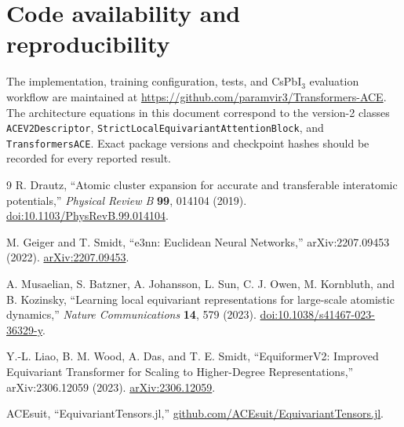 \documentclass[10pt]{article}
\begin{document}
\section*{Code availability and reproducibility}

The implementation, training configuration, tests, and CsPbI$_3$ evaluation
workflow are maintained at
\url{https://github.com/paramvir3/Transformers-ACE}. The architecture equations
in this document correspond to the version-2 classes
\texttt{ACEV2Descriptor}, \texttt{StrictLocalEquivariantAttentionBlock}, and
\texttt{TransformersACE}. Exact package versions and checkpoint hashes should be
recorded for every reported result.

\begin{thebibliography}{9}
R. Drautz,
``Atomic cluster expansion for accurate and transferable interatomic
potentials,'' \emph{Physical Review B} \textbf{99}, 014104 (2019).
\href{https://doi.org/10.1103/PhysRevB.99.014104}{doi:10.1103/PhysRevB.99.014104}.

M. Geiger and T. Smidt,
``e3nn: Euclidean Neural Networks,'' arXiv:2207.09453 (2022).
\href{https://arxiv.org/abs/2207.09453}{arXiv:2207.09453}.

A. Musaelian, S. Batzner, A. Johansson, L. Sun, C. J. Owen,
M. Kornbluth, and B. Kozinsky,
``Learning local equivariant representations for large-scale atomistic
dynamics,'' \emph{Nature Communications} \textbf{14}, 579 (2023).
\href{https://doi.org/10.1038/s41467-023-36329-y}{doi:10.1038/s41467-023-36329-y}.

Y.-L. Liao, B. M. Wood, A. Das, and T. E. Smidt,
``EquiformerV2: Improved Equivariant Transformer for Scaling to Higher-Degree
Representations,'' arXiv:2306.12059 (2023).
\href{https://arxiv.org/abs/2306.12059}{arXiv:2306.12059}.

ACEsuit,
``EquivariantTensors.jl,''
\href{https://github.com/ACEsuit/EquivariantTensors.jl}{github.com/ACEsuit/EquivariantTensors.jl}.
\end{thebibliography}
\end{document}
